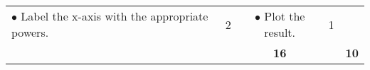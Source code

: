 \begin{minipage}{\textwidth}
\begin{tabular}{p{}|p{}c|p{}c}
\begin{minipage}{0.3\textwidth}
                $\bullet$ Label the x-axis with the appropriate {\color{violet} powers}.
            \end{minipage}
            &
            2
            &
            $\bullet$ Plot the {\color{red} result}. 
            &
            1
            \\\cline{3-3}\cline{5-5}
            \quad
            &
            \quad
            &
            \textbf{16}
            &
            \quad
            &
            \textbf{10}
    \end{tabular}
\end{minipage}
